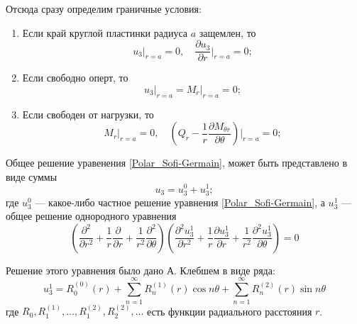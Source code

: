 Отсюда сразу определим граничные условия:
\begin{enumerate}
  \item Если край круглой пластинки радиуса $a$ защемлен, то
  \begin{equation}
    \label{Fixed}  
    u_3 \bigg |_{r=a}=0, \quad \frac{\partial u_3}{\partial r} \bigg |_{r=a} =0;
  \end{equation}

  \item Если свободно оперт, то
  \begin{equation}
    \label{Simply_supported}  
    u_3 \bigg |_{r=a}=M_r \bigg |_{r=a}=0;
  \end{equation}

  \item Если свободен от нагрузки, то
  \begin{equation}
    \label{Free}  
    M_r \bigg |_{r=a}=0, \quad \left ( Q_r - \frac{1}{r} \frac{\partial M_{\theta r}}{\partial \theta} \right ) \bigg |_{r=a}=0;
  \end{equation}
  \end{enumerate}

Общее решение уравенения \eqref{Polar_Sofi-Germain}, может быть представлено в виде суммы
\begin{equation}
  \label{bbb}  
  u_3=u_{3}^0+u_{3}^1;
\end{equation}
где $u_{3}^0$ --- какое-либо частное решение уравнения \eqref{Polar_Sofi-Germain}, а $u_{3}^1$ --- общее решение однородного уравнения 
\begin{equation}
  \label{Common_decision}
  \left (\frac{\partial ^2}{\partial r^2}+\frac{1}{r} \frac{\partial}{\partial r}+\frac{1}{r^2}\frac{\partial ^2}{\partial \theta} \right ) \left (\frac{\partial ^2 u_{3}^1}{\partial r^2}+\frac{1}{r} \frac{\partial u_{3}^1}{\partial r}+\frac{1}{r^2}\frac{\partial ^2 u_{3}^1}{\partial \theta} \right )=0
\end{equation}

Решение этого уравнения было дано А. Клебшем в виде ряда:
\begin{equation}
  \label{u_3^1}
  u_{3}^1=R_0^{(0)}(r)+ \sum_{n=1}^{\infty} R_{n}^{(1)}(r) \cos {n \theta}+ \sum_{n=1}^{\infty} R_{n}^{(2)}(r) \sin {n \theta}
\end{equation}
где $R_0, R_{1}^{(1)}, \ldots, R_{1}^{(2)}, R_{2}^{(2)}, \ldots $ есть функции радиального расстояния $r$.

